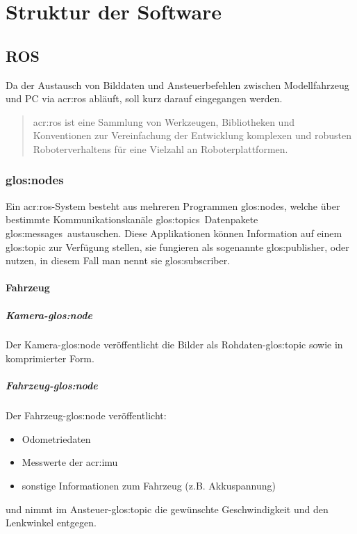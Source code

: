 \chapter{Struktur der Software}

\section{ROS}
Da der Austausch von Bilddaten und Ansteuerbefehlen zwischen Modellfahrzeug und PC via \gls{acr:ros} \autocite{ROSOrgPowering} abläuft, soll kurz darauf eingegangen werden. 
\begin{quotation}
\gls{acr:ros} ist eine Sammlung von Werkzeugen, Bibliotheken und Konventionen zur Vereinfachung der Entwicklung komplexen und robusten Roboterverhaltens für eine Vielzahl an Roboterplattformen. \autocite{ROSOrgROS}
\end{quotation}

\subsection{\glspl{glos:node}}
Ein \gls{acr:ros}-System besteht aus mehreren Programmen \glqq \glspl{glos:node}\grqq, welche über bestimmte Kommunikationskanäle \glqq \glspl{glos:topic}\grqq\ Datenpakete \glqq \glspl{glos:message}\grqq\ austauschen. Diese Applikationen können Information auf einem \gls{glos:topic} zur Verfügung stellen, sie fungieren als sogenannte \gls{glos:publisher}, oder nutzen, in diesem Fall man nennt sie \gls{glos:subscriber}.

\subsubsection{Fahrzeug}
\paragraph{Kamera-\gls{glos:node}}
Der Kamera-\gls{glos:node} veröffentlicht die Bilder als Rohdaten-\gls{glos:topic} sowie in komprimierter Form.
\paragraph{Fahrzeug-\gls{glos:node}}
Der Fahrzeug-\gls{glos:node} veröffentlicht:
\begin{itemize}
\item Odometriedaten 
\item Messwerte der \gls{acr:imu}
\item sonstige Informationen zum Fahrzeug (z.B. Akkuspannung)
\end{itemize}
und nimmt im Ansteuer-\gls{glos:topic} die gewünschte Geschwindigkeit und den Lenkwinkel entgegen.
